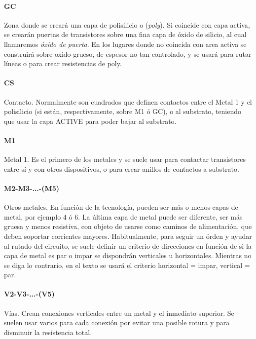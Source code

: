 \paragraph{GC}
Zona donde se creará una capa de polisilicio o (\textit{poly}). Si coincide con capa activa,
se crearán puertas de transistores sobre una fina capa de óxido de silicio,
al cual llamaremos \textit{óxido de puerta}.
En los lugares donde no coincida con area activa se construirá sobre oxido grueso,
de espesor no tan controlado, y se usará para rutar líneas o para crear resistencias
de poly.

\paragraph{CS}
Contacto. Normalmente son cuadrados que definen contactos entre el Metal 1 y el
polisilicio (si están, respectivamente, sobre M1 ó GC), o al substrato, teniendo que
usar la capa ACTIVE para poder bajar al substrato.

\paragraph{M1}
Metal 1. Es el primero de los metales y se suele usar para contactar
transistores entre sí y con otros dispositivos, o para crear anillos de contactos
a substrato.

\paragraph{M2-M3-...-(M5)}
Otros metales. En función de la tecnología, pueden ser
más o menos capas de metal, por ejemplo 4 ó 6. La última capa de metal puede ser
diferente, ser más gruesa y menos resistiva, con objeto de usarse como caminos de
alimentación, que deben soportar corrientes mayores. Habitualmente, para seguir un órden
y ayudar al rutado del circuito, se suele definir un criterio de direcciones
en función de si la capa de metal es par o impar se dispondrán verticales u
horizontales. Mientras no se diga lo contrario, en el texto se usará el criterio
horizontal = impar, vertical = par.

\paragraph{V2-V3-...-(V5)}
Vías. Crean conexiones verticales entre un metal y el
inmediato superior. Se suelen usar varios para cada conexión por evitar una
posible rotura y para disminuir la resistencia total.

